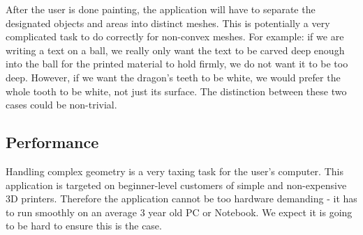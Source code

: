 After the user is done painting, the application will have to separate the designated objects and areas into distinct meshes. This is potentially a very complicated task to do correctly for non-convex meshes. For example: if we are writing a text on a ball, we really only want the text to be carved deep enough into the ball for the printed material to hold firmly, we do not want it to be too deep. However, if we want the dragon's teeth to be white, we would prefer the whole tooth to be white, not just its surface. The distinction between these two cases could be non-trivial.

\subsection{Performance}

Handling complex geometry is a very taxing task for the user's computer. This application is targeted on beginner-level customers of simple and non-expensive 3D printers. Therefore the application cannot be too hardware demanding - it has to run smoothly on an average 3 year old PC or Notebook. We expect it is going to be hard to ensure this is the case.



